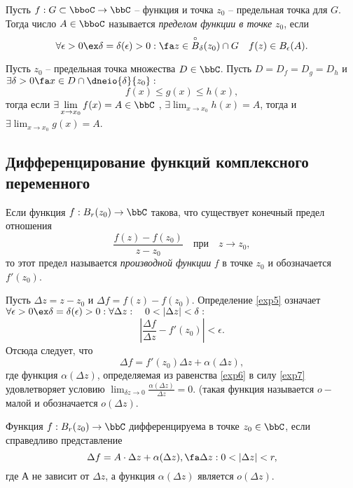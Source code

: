 \begin{defn}
Пусть $f: G\subset \bboC \to \bbC$ -- функция и точка $z_0$ -- предельная точка для $G$. Тогда число $A \in \bboC$ называется \textit{пределом функции в точке} $z_0$, если 
$$
\forall \epsilon > 0 \ex \delta = \delta(\epsilon)>0:\fa z \in \overset{\circ} {B}_\delta(z_0)\cap G \quad f(z) \in B_\epsilon(A). 
$$ 
\end{defn}

\begin{thm} 
\label{exp14}
Пусть $z_0$ -- предельная точка множества $D\in \bbC$. Пусть $D = D_f=D_g=D_h$ и $\exists \delta > 0 \fa x \in D \cap \dneio{\delta}{z_0}:$
$$f(x)\le g(x) \le h(x),$$ тогда если $\exists \lim_{x \to x_0}\limits f(x) = A \in \bbC$ , $\exists \lim_{x \to x_0}\limits h(x) = A$, тогда и $\exists \lim_{x \to x_0}\limits g(x) = A$.
\end{thm}

\subsection{Дифференцирование функций комплексного переменного}
\begin{defn}
\label{exp5}
Если функция  $f : B_r(z_0) \to \bbC $ такова, что существует конечный предел отношения
$$
\frac{f(z)-f(z_0)}{z-z_0} \quad\text{при}\quad z \to z_0,
$$
то этот предел называется \textit{производной функции} $f$ в точке $z_0$ и обозначается $f'(z_0)$. 
\end{defn}
Пусть $\Delta z = z - z_0$ и $\Delta f = f(z) - f(z_0)$. Определение \ref{exp5} означает $\forall \epsilon > 0 \ex \delta=\delta(\epsilon)>0: \\ \forall \Delta z:\quad 0 <|\Delta z| <\delta:$ 
\begin{equation}
\label{exp7}
\left|\frac{\Delta f}{\Delta z} - f'(z_0) \right| < \epsilon.
\end{equation}
Отсюда следует, что 
\begin{equation}
\label{exp6}
\Delta f = f'(z_0)\Delta z + \alpha(\Delta z),
\end{equation}
где функция $\alpha(\Delta z)$, определяемая из равенства \ref{exp6} в силу \ref{exp7} удовлетворяет условию $\lim_{\delta z \to 0}\limits \frac{\alpha(\Delta z)}{\Delta z} = 0$. (такая функция называется $o-$малой и обозначается $o(\Delta z)$.

\begin{defn}
Функция $f : B_r(z_0) \to \bbC $ дифференцируема в точке $z_0 \in \bbC$, если справедливо представление 
\begin{equation}
\label{exp4}
\Delta f = A\cdot \Delta z + \alpha(\Delta z), \fa \Delta z: 0 < |\Delta z|< r,
\end{equation}
где А не зависит от $\Delta z$, а функция $\alpha(\Delta z)$ является $o(\Delta z)$.
\end{defn}

